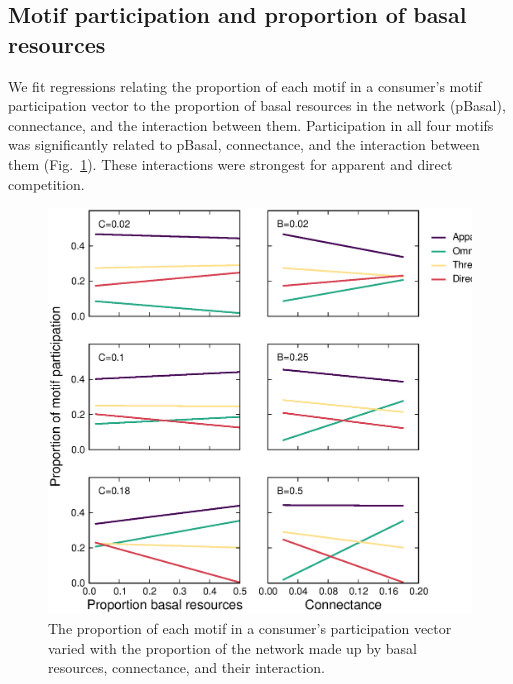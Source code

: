 \documentclass[12pt]{article}
\begin{document}
\begin{spacing}{2.0}
\clearpage
    

    \subsection*{Motif participation and proportion of basal resources}
    
        We fit regressions relating the proportion of each motif in a consumer's motif participation vector to the proportion of basal resources in the network (pBasal), connectance, and the interaction between them.
        Participation in all four motifs was significantly related to pBasal, connectance, and the interaction between them (Fig.~\ref{fig:basal_participation}).
        These interactions were strongest for apparent and direct competition.
        
        \begin{figure}
            \centering
            \includegraphics[height=.65\textheight]{figures/participation_vs_BC.eps}
            \caption{The proportion of each motif in a consumer's participation vector varied with the proportion of the network made up by basal resources, connectance, and their interaction.}
            \label{fig:basal_participation}
        \end{figure}
        

\end{spacing}
\end{document}
